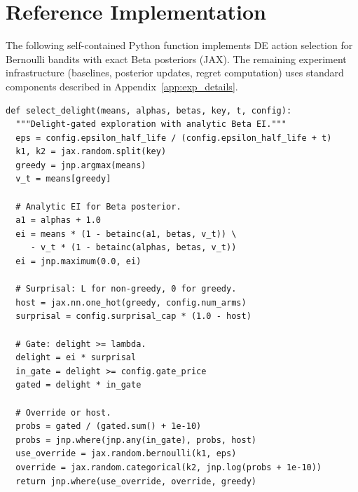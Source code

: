 \documentclass{article}
\begin{document}
\newpage
\section{Reference Implementation}
\label{app:code}

The following self-contained Python function implements DE action selection for Bernoulli bandits with exact Beta posteriors (JAX).
The remaining experiment infrastructure (baselines, posterior updates, regret computation) uses standard components described in Appendix~\ref{app:exp_details}.

{\small
\begin{verbatim}
def select_delight(means, alphas, betas, key, t, config):
  """Delight-gated exploration with analytic Beta EI."""
  eps = config.epsilon_half_life / (config.epsilon_half_life + t)
  k1, k2 = jax.random.split(key)
  greedy = jnp.argmax(means)
  v_t = means[greedy]

  # Analytic EI for Beta posterior.
  a1 = alphas + 1.0
  ei = means * (1 - betainc(a1, betas, v_t)) \
     - v_t * (1 - betainc(alphas, betas, v_t))
  ei = jnp.maximum(0.0, ei)

  # Surprisal: L for non-greedy, 0 for greedy.
  host = jax.nn.one_hot(greedy, config.num_arms)
  surprisal = config.surprisal_cap * (1.0 - host)

  # Gate: delight >= lambda.
  delight = ei * surprisal
  in_gate = delight >= config.gate_price
  gated = delight * in_gate

  # Override or host.
  probs = gated / (gated.sum() + 1e-10)
  probs = jnp.where(jnp.any(in_gate), probs, host)
  use_override = jax.random.bernoulli(k1, eps)
  override = jax.random.categorical(k2, jnp.log(probs + 1e-10))
  return jnp.where(use_override, override, greedy)
\end{verbatim}
}


% 
\end{document}
